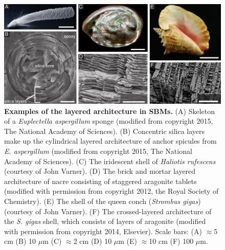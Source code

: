 \documentclass[12pt,onecolumn]{article}
\begin{document}
			\begin{figure}[ht!]
			\centering
			\includegraphics[width=\textwidth]{../Figures/FigureArchEx/Figure1_V4.pdf}
			\caption{\textbf{Examples of the layered architecture in SBMs.} (A) Skeleton of a \textit{Euplectella aspergillum} sponge (modified from \cite{monn2015new} copyright 2015, The National Academy of Sciences). (B) Concentric silica layers make up the cylindrical layered architecture of anchor spicules from \textit{E. aspergillum} (modified from \cite{monn2015new} copyright 2015, The National Academy of Sciences). (C) The iridescent shell of \textit{Haliotis rufescens} (courtesy of John Varner). (D) The brick and mortar layered architecture of nacre consisting of staggered aragonite tablets (modified with permission from \cite{rabiei2012nacre} copyright 2012, the Royal Society of Chemistry). (E) The shell of the queen conch (\textit{Strombus gigas}) (courtesy of John Varner). (F) The crossed-layered architecture of the \textit{S. gigas} shell, which consists of layers of aragonite (modified with permission from \cite{osuna2014shell} copyright 2014, Elsevier). Scale bars: (A) $\approx$5 cm (B) 10  $\mu$m  (C) $\approx$2  cm  (D) 10 $\mu$m  (E) $\approx$10  cm  (F) 100 $\mu$m. } 	\label{fig:arch}
			\end{figure}
\end{document}
